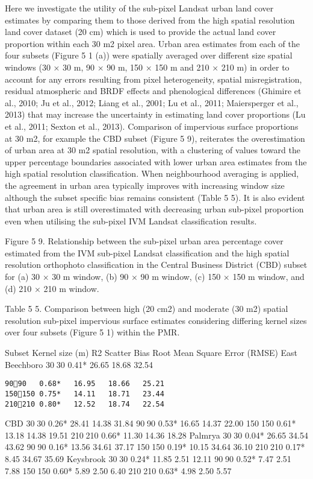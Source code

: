 \documentclass[]{book}
\begin{document}
Here we investigate the utility of the sub-pixel Landsat urban land
cover estimates by comparing them to those derived from the high spatial
resolution land cover dataset (20 cm) which is used to provide the
actual land cover proportion within each 30 m2 pixel area. Urban area
estimates from each of the four subsets (Figure 5 1 (a)) were spatially
averaged over different size spatial windows (30 × 30 m, 90 × 90 m, 150
× 150 m and 210 × 210 m) in order to account for any errors resulting
from pixel heterogeneity, spatial misregistration, residual atmospheric
and BRDF effects and phenological differences (Ghimire et al., 2010; Ju
et al., 2012; Liang et al., 2001; Lu et al., 2011; Maiersperger et al.,
2013) that may increase the uncertainty in estimating land cover
proportions (Lu et al., 2011; Sexton et al., 2013). Comparison of
impervious surface proportions at 30 m2, for example the CBD subset
(Figure 5 9), reiterates the overestimation of urban area at 30 m2
spatial resolution, with a clustering of values toward the upper
percentage boundaries associated with lower urban area estimates from
the high spatial resolution classification. When neighbourhood averaging
is applied, the agreement in urban area typically improves with
increasing window size although the subset specific bias remains
consistent (Table 5 5). It is also evident that urban area is still
overestimated with decreasing urban sub-pixel proportion even when
utilising the sub-pixel IVM Landsat classification results.

Figure 5 9. Relationship between the sub-pixel urban area percentage
cover estimated from the IVM sub-pixel Landsat classification and the
high spatial resolution orthophoto classification in the Central
Business District (CBD) subset for (a) 30 × 30 m window, (b) 90 × 90 m
window, (c) 150 × 150 m window, and (d) 210 × 210 m window.

Table 5 5. Comparison between high (20 cm2) and moderate (30 m2) spatial
resolution sub-pixel impervious surface estimates considering differing
kernel sizes over four subsets (Figure 5 1) within the PMR.

Subset Kernel size (m) R2 Scatter Bias Root Mean Square Error (RMSE)
East Beechboro 3030 0.41* 26.65 18.68 32.54

\begin{verbatim}
9090   0.68*   16.95   18.66   25.21
150150 0.75*   14.11   18.71   23.44
210210 0.80*   12.52   18.74   22.54
\end{verbatim}

CBD 3030 0.26* 28.41 14.38 31.84 9090 0.53* 16.65 14.37 22.00 150150
0.61* 13.18 14.38 19.51 210210 0.66* 11.30 14.36 18.28 Palmrya 3030
0.04* 26.65 34.54 43.62 9090 0.16* 13.56 34.61 37.17 150150 0.19*
10.15 34.64 36.10 210210 0.17* 8.45 34.67 35.69 Keysbrook 3030 0.24*
11.85 2.51 12.11 9090 0.52* 7.47 2.51 7.88 150150 0.60* 5.89 2.50 6.40
210210 0.63* 4.98 2.50 5.57
\end{document}
